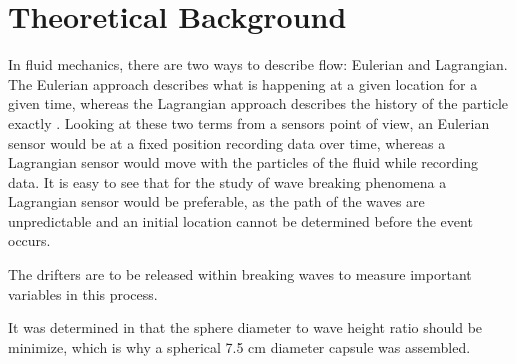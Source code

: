 \section{Theoretical Background}
In fluid mechanics, there are two ways to describe flow: Eulerian and Lagrangian.  The Eulerian approach describes what is happening at a given location for a given time, whereas the Lagrangian approach describes the history of the particle exactly \cite{Granger1985}.  Looking at these two terms from a sensors point of view, an Eulerian sensor would be at a fixed position recording data over time, whereas a Lagrangian sensor would move with the particles of the fluid while recording data.  It is easy to see that for the study of wave breaking phenomena a Lagrangian sensor would be preferable, as the path of the waves are unpredictable and an initial location cannot be determined before the event occurs.

The drifters are to be released within breaking waves to measure important variables in this process.

It was determined in \cite{Canals2012} that the sphere diameter to wave height ratio should be minimize, which is why a spherical 7.5 cm diameter capsule was assembled.

\lipsum[1]

\lipsum[1]

\lipsum[1]

\lipsum[1]